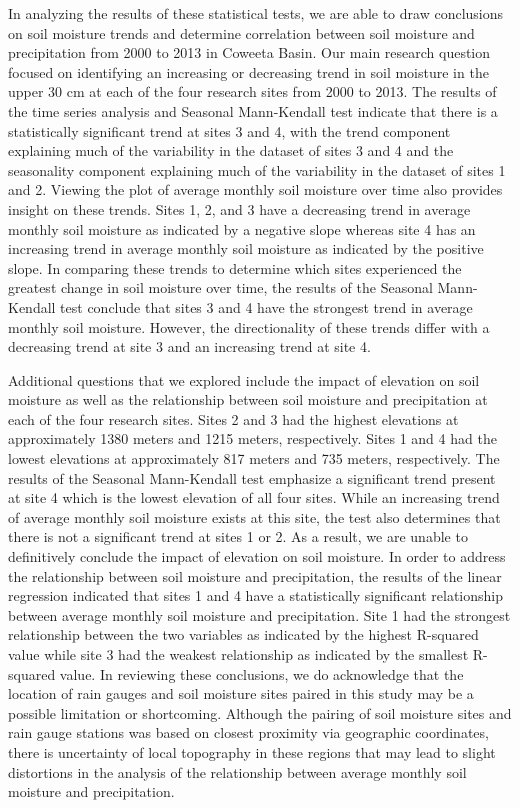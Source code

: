 \documentclass[
  12pt,
]{article}
\begin{document}
In analyzing the results of these statistical tests, we are able to draw
conclusions on soil moisture trends and determine correlation between
soil moisture and precipitation from 2000 to 2013 in Coweeta Basin. Our
main research question focused on identifying an increasing or
decreasing trend in soil moisture in the upper 30 cm at each of the four
research sites from 2000 to 2013. The results of the time series
analysis and Seasonal Mann-Kendall test indicate that there is a
statistically significant trend at sites 3 and 4, with the trend
component explaining much of the variability in the dataset of sites 3
and 4 and the seasonality component explaining much of the variability
in the dataset of sites 1 and 2. Viewing the plot of average monthly
soil moisture over time also provides insight on these trends. Sites 1,
2, and 3 have a decreasing trend in average monthly soil moisture as
indicated by a negative slope whereas site 4 has an increasing trend in
average monthly soil moisture as indicated by the positive slope. In
comparing these trends to determine which sites experienced the greatest
change in soil moisture over time, the results of the Seasonal
Mann-Kendall test conclude that sites 3 and 4 have the strongest trend
in average monthly soil moisture. However, the directionality of these
trends differ with a decreasing trend at site 3 and an increasing trend
at site 4.

Additional questions that we explored include the impact of elevation on
soil moisture as well as the relationship between soil moisture and
precipitation at each of the four research sites. Sites 2 and 3 had the
highest elevations at approximately 1380 meters and 1215 meters,
respectively. Sites 1 and 4 had the lowest elevations at approximately
817 meters and 735 meters, respectively. The results of the Seasonal
Mann-Kendall test emphasize a significant trend present at site 4 which
is the lowest elevation of all four sites. While an increasing trend of
average monthly soil moisture exists at this site, the test also
determines that there is not a significant trend at sites 1 or 2. As a
result, we are unable to definitively conclude the impact of elevation
on soil moisture. In order to address the relationship between soil
moisture and precipitation, the results of the linear regression
indicated that sites 1 and 4 have a statistically significant
relationship between average monthly soil moisture and precipitation.
Site 1 had the strongest relationship between the two variables as
indicated by the highest R-squared value while site 3 had the weakest
relationship as indicated by the smallest R-squared value. In reviewing
these conclusions, we do acknowledge that the location of rain gauges
and soil moisture sites paired in this study may be a possible
limitation or shortcoming. Although the pairing of soil moisture sites
and rain gauge stations was based on closest proximity via geographic
coordinates, there is uncertainty of local topography in these regions
that may lead to slight distortions in the analysis of the relationship
between average monthly soil moisture and precipitation.
\end{document}
